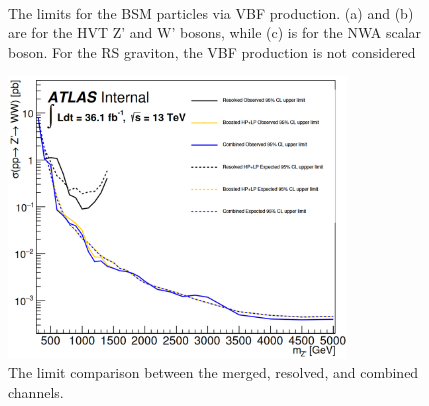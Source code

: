 \begin{figure}[ht]
	\centering
	\\
	\caption{The limits for the BSM particles via VBF production. (a) and (b) are for the HVT Z' and W' bosons, while (c) is for the NWA scalar boson. For the RS graviton, the VBF production is not considered}
	\label{Fig:limit_VBF}
\end{figure}
\begin{figure}[ht]
	\centering
	\includegraphics[width=0.8\textwidth]{Chapter4/limit_ResMerComb.png}
    \caption{The limit comparison between the merged, resolved, and combined channels.}
    \label{Fig:limit_comp_lvqq}
\end{figure}
